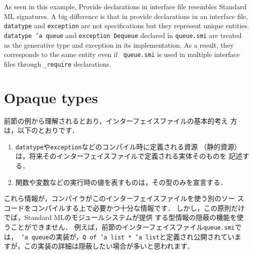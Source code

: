 \documentclass{jbook}
\newcommand{\txt}[2]{#2}
\begin{document}
	As seen in this example, Provide declarations in interface file
resembles Standard ML signatures.
	A big difference is that in provide declarations in an interface
file, {\tt datatype} and {\tt exception} are not specifications but they
represent unique entities.
	{\tt datatype 'a queue} and {\tt exception Dequeue} declared in
{\tt queue.smi} are treated as the generative type and exception in its
implementation.
	As a result, they corresponds to the same entity even if {\tt
queue.smi} is used in multiple interface files through  {\tt \_require}
declarations.

\fi%

\section{\txt{型の隠蔽}{Opaque types}}
\label{sec:tutorialOpaqueTypeInterface}

\ifjp%
	前節の例から理解されるとおり，インターフェイスファイルの基本的考え
方は，以下のとおりです．
\begin{enumerate}
\item {\tt datatype}や{\tt exception}などのコンパイル時に定義される資源
（静的資源）は，将来そのインターフェイスファイルで定義される実体そのものを
記述する．
\item 関数や変数などの実行時の値を表すものは，その型のみを宣言する．
\end{enumerate}
	これら情報が，コンパイラがこのインターフェイスファイルを使う別のソー
スコードをコンパイルする上で必要かつ十分な情報です．
	しかし，この原則だけでば，Standard MLのモジュールシステムが提供
する型情報の隠蔽の機能を使うことができません．
	例えば，前節のインターフェイスファイル{\tt queue.smi}では，{\tt
'a queue}の実装が，{\tt Q of 'a list * 'a list}と定義され公開されていま
すが，この実装の詳細は隠蔽したい場合が多いと思われます．
\end{document}
